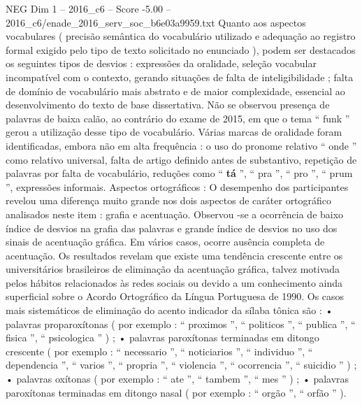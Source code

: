 \begin{textsample}{NEG Dim 1 – 2016\_c6 – Score -5.00 – 2016\_c6/enade\_2016\_serv\_soc\_b6e03a9959.txt}
Quanto aos aspectos vocabulares ( precisão semântica do vocabulário utilizado e adequação ao registro formal exigido pelo tipo de texto solicitado no enunciado ), podem ser destacados os seguintes tipos de desvios : expressões da oralidade, seleção vocabular incompatível com o contexto, gerando situações de falta de inteligibilidade ; falta de domínio de vocabulário mais abstrato e de maior complexidade, essencial ao desenvolvimento do texto de base dissertativa.
Não se observou presença de palavras de baixa calão, ao contrário do exame de 2015, em que o tema “ funk ” gerou a utilização desse tipo de vocabulário.
Várias marcas de oralidade foram identificadas, embora não em alta frequência : o uso do pronome relativo “ onde ” como relativo universal, falta de artigo definido antes de substantivo, repetição de palavras por falta de vocabulário, reduções como “ \textbf{tá} ”, “ pra ”, “ pro ”, “ prum ”, expressões informais.
Aspectos ortográficos : O desempenho dos participantes revelou uma diferença muito grande nos dois aspectos de caráter ortográfico analisados neste item : grafia e acentuação.
Observou -se a ocorrência de baixo índice de desvios na grafia das palavras e grande índice de desvios no uso dos sinais de acentuação gráfica.
Em vários casos, ocorre ausência completa de acentuação.
Os resultados revelam que existe uma tendência crescente entre os universitários brasileiros de eliminação da acentuação gráfica, talvez motivada pelos hábitos relacionados às redes sociais ou devido a um conhecimento ainda superficial sobre o Acordo Ortográfico da Língua Portuguesa de 1990.
Os casos mais sistemáticos de eliminação do acento indicador da sílaba tônica são : • palavras proparoxítonas ( por exemplo : “ proximos ”, “ politicos ”, “ publica ”, “ fisica ”, “ psicologica ” ) ; • palavras paroxítonas terminadas em ditongo crescente ( por exemplo : “ necessario ”, “ noticiarios ”, “ individuo ”, “ dependencia ”, “ varios ”, “ propria ”, “ violencia ”, “ ocorrencia ”, “ suicidio ” ) ; • palavras oxítonas ( por exemplo : “ ate ”, “ tambem ”, “ mes ” ) ; • palavras paroxítonas terminadas em ditongo nasal ( por exemplo : “ orgão ”, “ orfão ” ).

\end{textsample}

